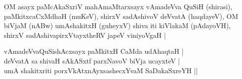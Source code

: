 \begin{entry}
\begin{shl}
OM asayx paMcAkaSxriV mahAmaMtarxsayx vAmadeVva QuSiH (shirasi), paMkitxcaCxMdhaH
(muKeV), shirxV sadAshivoV deVvatA (haqdayeV), OM biVjaM (nABw) umAshakitxH (guheyxV) shiva
iti kiVlakaM (pAdayoVH), shirxV sadAshivapirxVtayxtheRV japeV viniyoVgaH |
\end{shl}
\begin{shl}
vAmadeVvaQuSishAcxsayx paMkitxH CaMda udAhaqtaH |\\
deVvatA sa shivaH sAkASxtf parxNavoV biVja ucayxteV |\\
umA shakitxriti porxVkAtxnAyxsashecxYvaM SaDakaSxreYH ||
\end{shl}
\end{entry}

